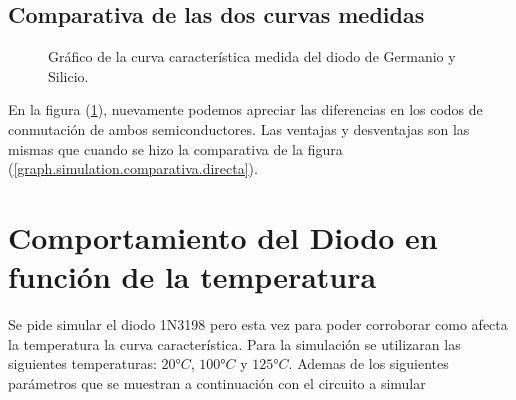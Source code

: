 \documentclass[chaptersright]{informeutn}
\begin{document}
      \section{Comparativa de las dos curvas medidas}
      \begin{figure}[!ht]
        \centering
        \caption{Gráfico de la curva característica medida del diodo de Germanio y Silicio.}
        \label{graph.comparativa.medida}
      \end{figure}

      En la figura (\ref{graph.comparativa.medida}), nuevamente podemos apreciar las diferencias en los codos de
      conmutación de ambos semiconductores. Las ventajas y desventajas son las mismas que cuando se hizo la comparativa
      de la figura (\ref{graph.simulation.comparativa.directa}).

    \chapter{Comportamiento del Diodo en función de la temperatura}
      Se pide simular el diodo 1N3198 pero esta vez para poder corroborar como afecta la temperatura la curva
      característica. Para la simulación se utilizaran las siguientes temperaturas: $20°C$, $100°C$ y $125°C$. Ademas
      de los siguientes parámetros que se muestran a continuación con el circuito a simular
\end{document}
